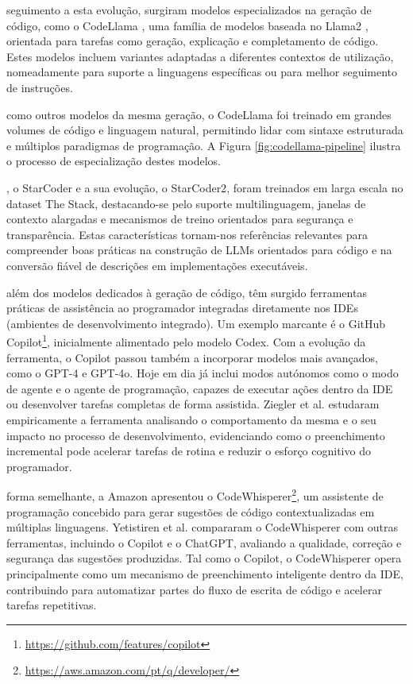  seguimento a esta evolução, surgiram modelos especializados na geração de código, como o CodeLlama \cite{CodeLlama}, uma família de modelos baseada no Llama2 \cite{Llama2}, orientada para tarefas como geração, explicação e completamento de código. Estes modelos incluem variantes adaptadas a diferentes contextos de utilização, nomeadamente para suporte a linguagens específicas ou para melhor seguimento de instruções.

 como outros modelos da mesma geração, o CodeLlama foi treinado em grandes volumes de código e linguagem natural, permitindo lidar com sintaxe estruturada e múltiplos paradigmas de programação. A Figura \ref{fig:codellama-pipeline} ilustra o processo de especialização destes modelos.

, o StarCoder\cite{StarCoder} e a sua evolução, o StarCoder2\cite{StarCoder2}, foram treinados em larga escala no dataset The Stack, destacando-se pelo suporte multilinguagem, janelas de contexto alargadas e mecanismos de treino orientados para segurança e transparência. Estas características tornam-nos referências relevantes para compreender boas práticas na construção de LLMs orientados para código e na conversão fiável de descrições em implementações executáveis.\\\par

 além dos modelos dedicados à geração de código, têm surgido ferramentas práticas de assistência ao programador integradas diretamente nos IDEs (ambientes de desenvolvimento integrado). Um exemplo marcante é o GitHub Copilot\footnote{\href{https://github.com/features/copilot}{https://github.com/features/copilot}}, inicialmente alimentado pelo modelo Codex. Com a evolução da ferramenta, o Copilot passou também a incorporar modelos mais avançados, como o GPT-4 e GPT-4o. Hoje em dia já inclui modos autónomos como o modo de agente e o agente de programação, capazes de executar ações dentro da IDE ou desenvolver tarefas completas de forma assistida. Ziegler et al.\cite{GitHubCopilot} estudaram empiricamente a ferramenta analisando o comportamento da mesma e o seu impacto no processo de desenvolvimento, evidenciando como o preenchimento incremental pode acelerar tarefas de rotina e reduzir o esforço cognitivo do programador.\par

 forma semelhante, a Amazon apresentou o CodeWhisperer\footnote{\href{https://aws.amazon.com/pt/q/developer/}{https://aws.amazon.com/pt/q/developer/}}, um assistente de programação concebido para gerar sugestões de código contextualizadas em múltiplas linguagens. Yetistiren et al.\cite{AmazonCodeWhisperer} compararam o CodeWhisperer com outras ferramentas, incluindo o Copilot e o ChatGPT, avaliando a qualidade, correção e segurança das sugestões produzidas. Tal como o Copilot, o CodeWhisperer opera principalmente como um mecanismo de preenchimento inteligente dentro da IDE, contribuindo para automatizar partes do fluxo de escrita de código e acelerar tarefas repetitivas.\par


